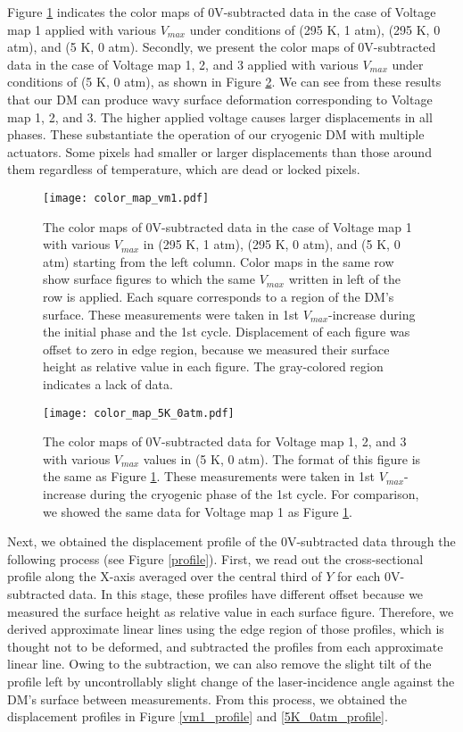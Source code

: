 \documentclass[a4paper]{article}
\begin{document}
Figure \ref{color_map_vm1} indicates the color maps of 0V-subtracted data in the case of Voltage map 1 applied with various $V_{max}$ under conditions of (295 K, 1 atm), (295 K, 0 atm), and (5 K, 0 atm). Secondly, we present the color maps of 0V-subtracted data in the case of Voltage map 1, 2, and 3 applied with various $V_{max}$ under conditions of (5 K, 0 atm), as shown in Figure \ref{color_map_5K_0atm}. We can see from these results that our DM can produce wavy surface deformation corresponding to Voltage map 1, 2, and 3. The higher applied voltage causes larger displacements in all phases. These substantiate the operation of our cryogenic DM with multiple actuators. Some pixels had smaller or larger displacements than those around them regardless of temperature, which are dead or locked pixels.  

\begin{figure}[p]
\centering
\texttt{[image: color\_map\_vm1.pdf]}
\caption{The color maps of 0V-subtracted data in the case of Voltage map 1 with various $V_{max}$ in (295 K, 1 atm), (295 K, 0 atm), and (5 K, 0 atm) starting from the left column. Color maps in the same row show surface figures to which the same $V_{max}$ written in left of the row is applied. Each square corresponds to a region of the DM's surface. These measurements were taken in 1st $V_{max}$-increase during the initial phase and the 1st cycle. Displacement of each figure was offset to zero in edge region, because we measured their surface height as relative value in each figure. The gray-colored region indicates a lack of data.}
\label{color_map_vm1}
\end{figure}

\begin{figure}[p]
\centering
\texttt{[image: color\_map\_5K\_0atm.pdf]}
\caption{The color maps of 0V-subtracted data for Voltage map 1, 2, and 3 with various $V_{max}$ values in (5 K, 0 atm). The format of this figure is the same as Figure \ref{color_map_vm1}. These measurements were taken in 1st $V_{max}$-increase during the cryogenic phase of the 1st cycle. For comparison, we showed the same data for Voltage map 1 as Figure \ref{color_map_vm1}.}
\label{color_map_5K_0atm}
\end{figure}

Next, we obtained the displacement profile of the 0V-subtracted data through the following process (see Figure \ref{profile}). First, we read out the cross-sectional profile along the X-axis averaged over the central third of $Y$ for each 0V-subtracted data. In this stage, these profiles have different offset because we measured the surface height as relative value in each surface figure. Therefore, we derived approximate linear lines using the edge region of those profiles, which is thought not to be deformed, and subtracted the profiles from each approximate linear line. Owing to the subtraction, we can also remove the slight tilt of the profile left by uncontrollably slight change of the laser-incidence angle against the DM's surface between measurements. From this process, we obtained the displacement profiles in Figure \ref{vm1_profile} and \ref{5K_0atm_profile}.
\end{document}
